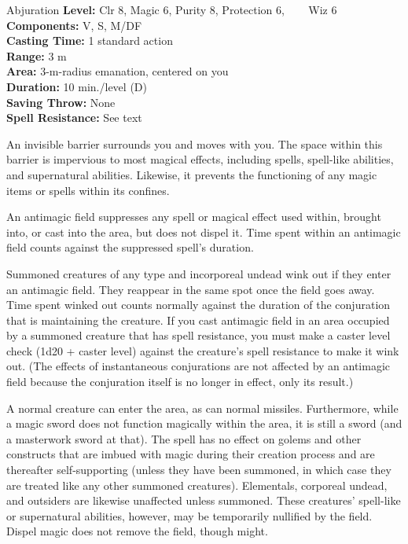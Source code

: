 {Abjuration}
{
	\textbf{Level:}
	Clr 8, Magic 6, Purity 8, Protection 6, ~~~ Wiz 6\\
	\textbf{Components:}
	V, S, M/DF\\
	\textbf{Casting Time:}
	1 standard action\\
	\textbf{Range:}
	3 m\\
	\textbf{Area:}
	3-m-radius emanation, centered on you\\
	\textbf{Duration:}
	10 min./level (D)\\
	\textbf{Saving Throw:}
	None\\
	\textbf{Spell Resistance:}
	See text\\
}
{
	An invisible barrier surrounds you and moves with you. The space within this barrier is impervious to most magical effects, including spells, spell-like abilities, and supernatural abilities. Likewise, it prevents the functioning of any magic items or spells within its confines.

	An antimagic field suppresses any spell or magical effect used within, brought into, or cast into the area, but does not dispel it. Time spent within an antimagic field counts against the suppressed spell's duration.

	Summoned creatures of any type and incorporeal undead wink out if they enter an antimagic field. They reappear in the same spot once the field goes away. Time spent winked out counts normally against the duration of the conjuration that is maintaining the creature. If you cast antimagic field in an area occupied by a summoned creature that has spell resistance, you must make a caster level check (1d20 + caster level) against the creature's spell resistance to make it wink out. (The effects of instantaneous conjurations are not affected by an antimagic field because the conjuration itself is no longer in effect, only its result.)

	A normal creature can enter the area, as can normal missiles. Furthermore, while a magic sword does not function magically within the area, it is still a sword (and a masterwork sword at that). The spell has no effect on golems and other constructs that are imbued with magic during their creation process and are thereafter self-supporting (unless they have been summoned, in which case they are treated like any other summoned creatures). Elementals, corporeal undead, and outsiders are likewise unaffected unless summoned. These creatures' spell-like or supernatural abilities, however, may be temporarily nullified by the field. Dispel magic does not remove the field, though  might.

}
